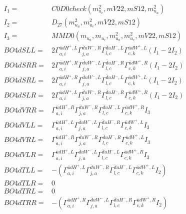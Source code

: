 \documentclass[A4,landscape]{article}
\begin{document}
\begin{align} 
I_1 = & C0D0check(m^2_{u_{{c}}}, mV22, mS12, m^2_{u_{{a}}}) \\ 
I_2 = & D_{27}(m^2_{u_{{a}}}, m^2_{u_{{c}}}, mV22, mS12) \\ 
I_3 = & MMD0(m_{u_{{a}}}, m_{u_{{c}}}, m^2_{u_{{a}}}, m^2_{u_{{c}}}, mV22, mS12) \\ 
  BO4dSLL= & 2  \Gamma^{\bar{u}d H^+ ,L}_{a, i} \Gamma^{\bar{d}u W^-,R}_{j, a} \Gamma^{\bar{d}u H^-,L}_{l, c} \Gamma^{\bar{u}d W^+ ,L}_{c, k} (I_1 - 2 I_2) \\ 
  BO4dSRR= & 2  \Gamma^{\bar{u}d H^+ ,R}_{a, i} \Gamma^{\bar{d}u W^-,L}_{j, a} \Gamma^{\bar{d}u H^-,R}_{l, c} \Gamma^{\bar{u}d W^+ ,R}_{c, k} (I_1 - 2 I_2) \\ 
  BO4dSRL= & 2  \Gamma^{\bar{u}d H^+ ,R}_{a, i} \Gamma^{\bar{d}u W^-,L}_{j, a} \Gamma^{\bar{d}u H^-,L}_{l, c} \Gamma^{\bar{u}d W^+ ,L}_{c, k} (I_1 - 2 I_2) \\ 
  BO4dSLR= & 2  \Gamma^{\bar{u}d H^+ ,L}_{a, i} \Gamma^{\bar{d}u W^-,R}_{j, a} \Gamma^{\bar{d}u H^-,R}_{l, c} \Gamma^{\bar{u}d W^+ ,R}_{c, k} (I_1 - 2 I_2) \\ 
  BO4dVRR= &  \Gamma^{\bar{u}d H^+ ,R}_{a, i} \Gamma^{\bar{d}u W^-,R}_{j, a} \Gamma^{\bar{d}u H^-,L}_{l, c} \Gamma^{\bar{u}d W^+ ,R}_{c, k} I_3 \\ 
  BO4dVLL= &  \Gamma^{\bar{u}d H^+ ,L}_{a, i} \Gamma^{\bar{d}u W^-,L}_{j, a} \Gamma^{\bar{d}u H^-,R}_{l, c} \Gamma^{\bar{u}d W^+ ,L}_{c, k} I_3 \\ 
  BO4dVRL= &  \Gamma^{\bar{u}d H^+ ,R}_{a, i} \Gamma^{\bar{d}u W^-,R}_{j, a} \Gamma^{\bar{d}u H^-,R}_{l, c} \Gamma^{\bar{u}d W^+ ,L}_{c, k} I_3 \\ 
  BO4dVLR= &  \Gamma^{\bar{u}d H^+ ,L}_{a, i} \Gamma^{\bar{d}u W^-,L}_{j, a} \Gamma^{\bar{d}u H^-,L}_{l, c} \Gamma^{\bar{u}d W^+ ,R}_{c, k} I_3 \\ 
  BO4dTLL= & -( \Gamma^{\bar{u}d H^+ ,L}_{a, i} \Gamma^{\bar{d}u W^-,R}_{j, a} \Gamma^{\bar{d}u H^-,L}_{l, c} \Gamma^{\bar{u}d W^+ ,L}_{c, k} I_2) \\ 
  BO4dTLR= & 0 \\ 
  BO4dTRL= & 0 \\ 
  BO4dTRR= & -( \Gamma^{\bar{u}d H^+ ,R}_{a, i} \Gamma^{\bar{d}u W^-,L}_{j, a} \Gamma^{\bar{d}u H^-,R}_{l, c} \Gamma^{\bar{u}d W^+ ,R}_{c, k} I_2) \\ 
\end{align} 
\end{document}
